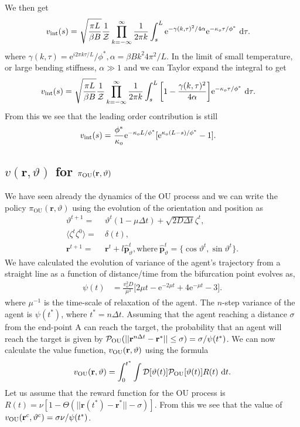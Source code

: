 \documentclass[12pt]{article}
\def\d{\text{d}}
\def\e{\text{e}}
\def\r{\mathbf{r}}
\def\ph{\hat{\mathbf{p}}}
\def\P{\mathcal{P}}
\def\D{\mathcal{D}}
\def\Z{\mathcal{Z}}
\def\theta{\vartheta}
\begin{document}
We then get
\begin{align}
    v_{\rm int}(s) =& \ \sqrt{\frac{\pi L}{\beta B}}  \frac{1}{\Z} \prod_{k=-\infty}^\infty \frac{1}{2\pi k}  \int_{s}^L \e^{-\gamma(k, \tau)^2/4\alpha} \e^{-\kappa_o \tau/\phi^*} \ \d \tau.
\end{align}
where $\gamma(k, \tau) = \e^{i 2 \pi k \tau/L}/\phi^*, \alpha = \beta B k^2 4 \pi^2/L$. In the limit of small temperature,
or large bending stiffness, $\alpha \gg 1$ and we can Taylor expand the integral to get
\begin{align}
    v_{\rm int}(s) =& \ \sqrt{\frac{\pi L}{\beta B}}  \frac{1}{\Z} \prod_{k=-\infty}^\infty \frac{1}{2\pi k}  \int_{s}^L \bigg[ 1 - \frac{\gamma(k, \tau)^2}{4\alpha} \bigg] \e^{-\kappa_o \tau/\phi^*} \ \d \tau.
\end{align}
From this we see that the leading order contribution is still
\begin{align}
    v_{\rm int}(s) =& \ \frac{\phi^*}{\kappa_o} \e^{-\kappa_o L/\phi^*} [ \e^{\kappa_o(L-s)/\phi^*} - 1].
\end{align}

\subsection{$v(\r, \theta)$ for $\pi_{\rm OU}(\r, \theta)$}
We have seen already the dynamics of the OU process and we can write the policy $\pi_\text{OU}(\r, \theta)$ using the evolution
of the orientation and position as
\begin{align}
    \theta^{t+1} =& \ \theta^t (1 - \mu \Delta t ) + \sqrt{2 D \Delta t} \zeta^t, \\
    \langle \zeta^t \zeta^0 \rangle =& \ \delta(t), \\
    \r^{t+1} =& \ \r^{t} + l \ph_\theta^t, \text{where} \ \ph_\theta^t = \{ \cos \theta^t, \sin \theta^t \}.
\end{align}
We have calculated the evolution of variance of the agent's trajectory from a straight line as a function of
distance/time from the bifurcation point evolves as,
\begin{align}
    \psi(t) & = \frac{v_o^2 D}{\mu^3} \bigg[ 2 \mu t - \e^{-2 \mu t} + 4 \e^{-\mu t} - 3 \bigg].
\end{align}
where $\mu^{-1}$ is the time-scale of relaxation of the agent. The $n$-step variance of the agent is
$\psi (t^*)$, where $t^* = n \Delta t$. Assuming that the agent reaching a distance $\sigma$ from the end-point A can reach the
target, the probability that an agent will reach the target is given by $\P_{\rm OU}(||\r^{n\Delta t} - \r^*|| \leq \sigma)
= \sigma/\psi(t^*)$. We can now calculate the value function, $v_{\rm OU}(\r, \theta)$ using the formula
\[
    v_{\rm OU}(\r, \theta) = \int_{0}^{t^*} \int \D[\theta(t)] \P_{\rm OU}[\theta(t)] R(t) \ \d t.
\]
Let us assume that the reward function for the OU process is $R(t) = \nu[1 - \Theta(||\r(t^*) - \r^*|| - \sigma)]$.
From this we see that the value of $v_{\rm OU}(\r^c, \theta^c) = \sigma \nu/\psi(t^*)$.
\end{document}
